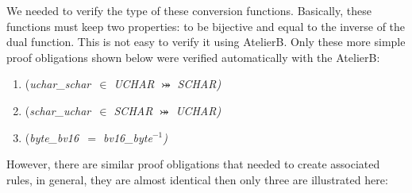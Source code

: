 We needed to verify the type of these conversion functions.%
Basically, these functions must keep two properties: to be bijective and equal to the inverse of the dual function.  This is not easy to verify it using AtelierB. Only these more simple proof obligations shown below were verified automatically with the AtelierB:
 
\begin{enumerate}

\item (\it uchar\_schar\rm \ $\in$ \textit{UCHAR} $\bij$ \textit{SCHAR})
\item (\it schar\_uchar\rm \ $\in$ \textit{SCHAR} $\bij$ \textit{UCHAR})
\item (\it byte\_bv16\rm \ $=$ \it bv16\_byte\rm $^{-1}$) 

\end{enumerate}

However, there are similar proof obligations that needed to create associated rules, in general, they are almost identical then only three are illustrated here:

